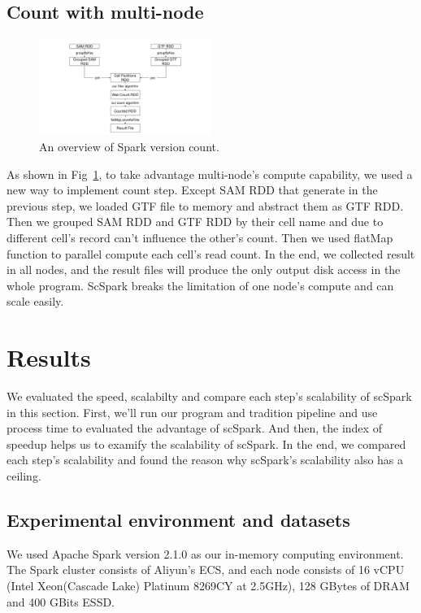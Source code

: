 \documentclass[conference]{IEEEtran}
\begin{document}
\subsection{Count with multi-node}

\begin{figure}
  \includegraphics[width=0.5\textwidth]{fig3.pdf}
  \caption{An overview of Spark version count.} \label{fig3}
\end{figure}

As shown in Fig~\ref{fig3}, to take advantage multi-node's compute capability, we used a new way to implement count step. 
Except SAM RDD that generate in the previous step, we loaded GTF file to memory and abstract them as GTF RDD. 
Then we grouped SAM RDD and GTF RDD by their cell name and due to different cell's record can't influence the other's count. 
Then we used flatMap function to parallel compute each cell's read count. 
In the end, we collected result in all nodes, and the result files will produce the only output disk access in the whole program. 
ScSpark breaks the limitation of one node's compute and can scale easily. 

\section{Results}
We evaluated the speed, scalabilty and compare each step's scalability of scSpark in this section. 
First, we'll run our program and tradition pipeline and use process time to evaluated the advantage of scSpark. 
And then, the index of speedup helps us to examify the scalability of scSpark.
In the end, we compared each step's scalability and found the reason why scSpark's scalability also has a ceiling. 

\subsection{Experimental environment and datasets}
We used Apache Spark version 2.1.0 as our in-memory computing environment.
The Spark cluster consists of Aliyun's ECS, and each node consists of 16 vCPU
(Intel Xeon(Cascade Lake) Platinum 8269CY at 2.5GHz), 128 GBytes of DRAM and 400 GBits ESSD.
\end{document}
